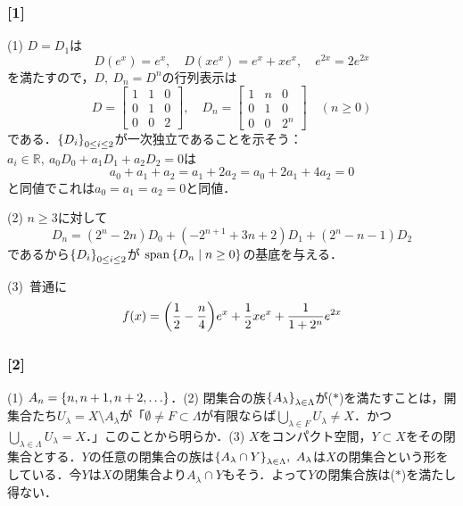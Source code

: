 \documentclass[a4j]{ltjsarticle}
\newcommand{\Rset}{\mathbb{R}}
\newcommand{\1}{\mathbbm{1}}
\numberwithin{equation}{section}
\theoremstyle{definition}
\begin{document}
\subsubsection*{[1]}
(1) $D=D_1$は
\begin{equation}
    D(e^x)=e^x,\quad D(xe^x)=e^x+xe^x,\quad e^{2x}=2e^{2x} 
\end{equation}
を満たすので，$D,\ D_n=D^n$の行列表示は
\begin{equation}
    D=\begin{bmatrix}
        1 & 1 & 0 \\
        0 & 1 & 0 \\
        0 & 0 & 2 
    \end{bmatrix},\quad D_n=\begin{bmatrix}
        1 & n & 0 \\
        0 & 1 & 0 \\
        0 & 0 & 2^n  
    \end{bmatrix}\quad (n\geq0)
\end{equation}
である．$\qty{D_i}_{0\leq i\leq 2}$が一次独立であることを示そう：$a_i\in\Rset,\ a_0D_0+a_1D_1+a_2D_2=0$は
\begin{equation}
    a_0+a_1+a_2=a_1+2a_2=a_0+2a_1+4a_2=0 
\end{equation}
と同値でこれは$a_0=a_1=a_2=0$と同値．

(2) $n\geq 3$に対して
\begin{equation}
    D_n=(2^n-2n)D_0+(-2^{n+1}+3n+2)D_1+(2^n-n-1)D_2 
\end{equation}
であるから$\qty{D_i}_{0\leq i\leq 2}$が
$\mathop{\mathrm{span}}\qty{D_n\mid n\geq0}$の基底を与える．

(3)\ 普通に
\begin{equation}
    f(x)=\qty(\frac{1}{2}-\frac{n}{4})e^x+\frac{1}{2}xe^x+\frac{1}{1+2^n}e^{2x}
\end{equation}
\subsubsection*{[2]}
(1) $A_n=\qty{n,n+1,n+2,\ldots}$．(2) 閉集合の族$\qty{A_{\lambda}}_{\lambda\in\Lambda}$が($\ast$)を満たすことは，開集合たち$U_\lambda=X\setminus A_\lambda$が「$\emptyset\neq F\subset \Lambda$が有限ならば$\bigcup_{\lambda\in F}U_{\lambda}\neq X$．かつ$\bigcup_{\lambda\in\Lambda}U_{\lambda}=X$．」このことから明らか．(3) $X$をコンパクト空間，$Y\subset X$をその閉集合とする．$Y$の任意の閉集合の族は$\qty{A_{\lambda}\cap Y}_{\lambda\in\Lambda},\ A_{\lambda}$は$X$の閉集合という形をしている．今$Y$は$X$の閉集合より$A_{\lambda}\cap Y$もそう．よって$Y$の閉集合族は($\ast$)を満たし得ない．
\end{document}
